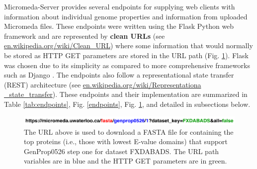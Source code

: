 Micromeda-Server provides several endpoints for supplying web clients with information about individual genome properties and information from uploaded Micromeda files. These endpoints were written using the Flask Python web framework \cite{grinberg2018flask} and are represented by \textbf{clean URLs} (see \href{en.wikipedia.org/wiki/Clean\_URL}{en.wikipedia.org/wiki/Clean\_URL}) where some information that would normally be stored as HTTP GET parameters are stored in the URL path (Fig. \ref{fig:endpoint-url}). Flask was chosen due to its simplicity as compared to more comprehensive frameworks such as Django \cite{holovaty2009definitive}. The endpoints also follow a representational state transfer (REST) architecture \cite{fielding2000representational} (see \href{en.wikipedia.org/wiki/Representational\_state\_transfer}{en.wikipedia.org/wiki/Representationa \_state\_transfer}). These endpoints and their implementation are summarized in Table \ref{tab:endpoints}, Fig. \ref{endpoints}, Fig. \ref{fig:endpoint-url}, and detailed in subsections below.

\begin{figure}[!ht]
  \centering
	\includegraphics[width=\textwidth]{media/Coloured-Endpoint.pdf}
	 \caption{The URL above is used to download a FASTA file for containing the top proteins (i.e., those with lowest E-value domains) that support GenProp0526 step one for dataset FXDABADS. The URL path variables are in blue and the HTTP GET parameters are in green.}
	 \label{fig:endpoint-url}
\end{figure}

